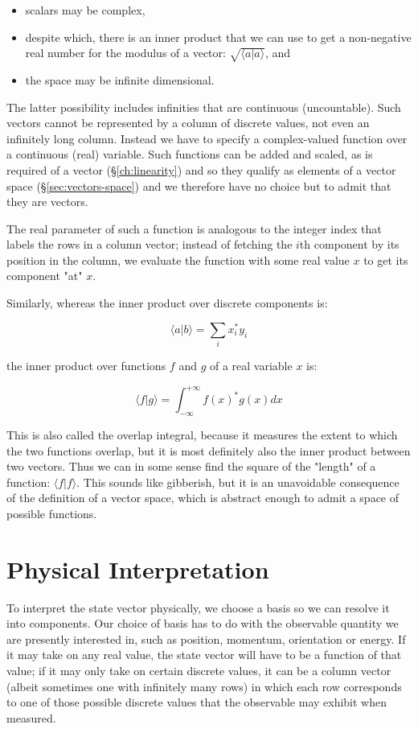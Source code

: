 \begin{itemize}
  \item scalars may be complex,
  \item despite which, there is an inner product that we can use to get a non-negative real number for the modulus of a vector: $\sqrt{\langle a|a \rangle}$, and 
  \item the space may be infinite dimensional.
\end{itemize}

The latter possibility includes infinities that are continuous (uncountable). Such vectors cannot be represented by a column of discrete values, not even an infinitely long column. Instead we have to specify a complex-valued function over a continuous (real) variable. Such functions can be added and scaled, as is required of a vector (§\ref{ch:linearity}) and so they qualify as elements of a vector space (§\ref{sec:vectors-space}) and we therefore have no choice but to admit that they are vectors.

The real parameter of such a function is analogous to the integer index that labels the rows in a column vector; instead of fetching the $i$th component by its position in the column, we evaluate the function with some real value $x$ to get its component "at" $x$.

Similarly, whereas the inner product over discrete components is:

$$
\langle a | b \rangle
=
\sum_i
x_i^* y_i
$$

the inner product over functions $f$ and $g$ of a real variable $x$ is:

$$
\langle f | g \rangle
=
\int_{-\infty}^{+\infty}
f(x)^* g(x)
dx
$$

This is also called the overlap integral, because it measures the extent to which the two functions overlap, but it is most definitely also the inner product between two vectors. Thus we can in some sense find the square of the "length" of a function: $\langle f | f \rangle$. This sounds like gibberish, but it is an unavoidable consequence of the definition of a vector space, which is abstract enough to admit a space of possible functions.

\section{Physical Interpretation}

To interpret the state vector physically, we choose a basis so we can resolve it into components. Our choice of basis has to do with the observable quantity we are presently interested in, such as position, momentum, orientation or energy. If it may take on any real value, the state vector will have to be a function of that value; if it may only take on certain discrete values, it can be a column vector (albeit sometimes one with infinitely many rows) in which each row corresponds to one of those possible discrete values that the observable may exhibit when measured.

